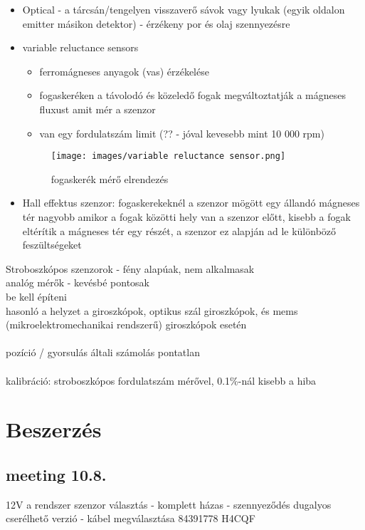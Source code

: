 \documentclass{article}
\begin{document}
	\begin{itemize}
		\item Optical - a tárcsán/tengelyen visszaverő sávok vagy lyukak (egyik oldalon emitter másikon detektor) - érzékeny por és olaj szennyezésre
		\item variable reluctance sensors
		\begin{itemize}
			\item ferromágneses anyagok (vas) érzékelése
			\item fogaskeréken a távolodó és közeledő fogak megváltoztatják a mágneses fluxust amit mér a szenzor
			\item van egy fordulatszám limit (?? - jóval kevesebb mint 10 000 rpm)
		\end{itemize}
		\begin{figure}[h]
			\caption{fogaskerék mérő elrendezés}
			\centering
			\texttt{[image: images/variable reluctance sensor.png]}
		\end{figure}
		\item Hall effektus szenzor:  fogaskerekeknél a szenzor mögött egy állandó mágneses tér nagyobb amikor a fogak közötti hely van a szenzor előtt, kisebb a fogak eltérítik a mágneses tér egy részét, a szenzor ez alapján ad le különböző feszültségeket
	\end{itemize}
	Stroboszkópos szenzorok - fény alapúak, nem alkalmasak \\
	analóg mérők - kevésbé pontosak\\
	be kell építeni\\
	hasonló a helyzet a giroszkópok, optikus szál giroszkópok, és mems (mikroelektromechanikai rendszerű) giroszkópok esetén\\
	\\
	pozíció / gyorsulás általi számolás pontatlan\\
	\\
	kalibráció: stroboszkópos fordulatszám mérővel, 0.1\%-nál kisebb a hiba\\
	
	\section{Beszerzés}
	
	\subsection{meeting 10.8.}
	
	12V a rendszer
	szenzor választás - komplett házas - szennyeződés
	dugalyos cserélhető verzió - kábel megválasztása
	84391778 H4CQF
	
\end{document}
